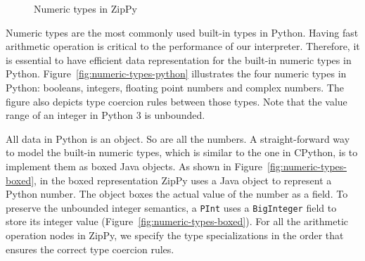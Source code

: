\begin{figure}[t]
{  \label{fig:numeric-types-boxed}
}
\caption{Numeric types in ZipPy}
\label{fig:numeric-types-zippy}
\end{figure}

Numeric types are the most commonly used built-in types in Python.
Having fast arithmetic operation is critical to the performance of our interpreter.
Therefore, it is essential to have efficient data representation for the built-in numeric types in Python.
Figure~\ref{fig:numeric-types-python} illustrates the four numeric types in Python: booleans, integers, floating point numbers and complex numbers.
The figure also depicts type coercion rules between those types.
Note that the value range of an integer in Python 3 is unbounded.

All data in Python is an object.
So are all the numbers.
A straight-forward way to model the built-in numeric types, which is similar to the one in CPython, is to implement them as boxed Java objects.
As shown in Figure~\ref{fig:numeric-types-boxed}, in the boxed representation ZipPy uses a Java object to represent a Python number.
The object boxes the actual value of the number as a field.
To preserve the unbounded integer semantics, a \texttt{PInt} uses a \texttt{BigInteger} field to store its integer value (Figure~\ref{fig:numeric-types-boxed}).
For all the arithmetic operation nodes in ZipPy, we specify the type specializations in the order that ensures the correct type coercion rules.

